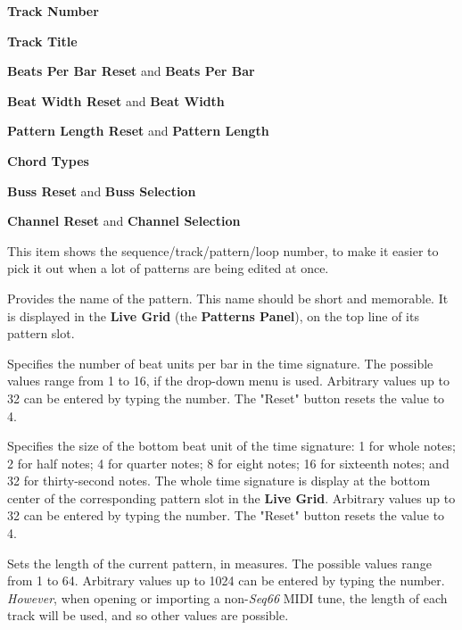    \begin{enumber}
      \item \textbf{Track Number}
      \item \textbf{Track Title}
      \item \textbf{Beats Per Bar Reset} and \textbf{Beats Per Bar}
      \item \textbf{Beat Width Reset} and \textbf{Beat Width}
      \item \textbf{Pattern Length Reset} and \textbf{Pattern Length}
      \item \textbf{Chord Types}
      \item \textbf{Buss Reset} and \textbf{Buss Selection}
      \item \textbf{Channel Reset} and \textbf{Channel Selection}
   \end{enumber}

   \setcounter{ItemCounter}{0}      %

   This item shows the sequence/track/pattern/loop
   number, to make it easier to pick it out when a lot of patterns are being
   edited at once.

   Provides the name of the pattern.
   This name should be short and memorable.
   It is displayed in the \textbf{Live Grid} (the \textbf{Patterns Panel}),
   on the top line of its pattern slot.

   Specifies the number of beat units per bar in the time signature.
   The possible values range from 1 to 16, if the drop-down menu is used.
   Arbitrary values up to 32 can be entered by typing the number.
   The "Reset" button resets the value to 4.

   Specifies the size of the bottom beat unit of the time signature:
   1 for whole notes; 2 for half notes; 4 for quarter notes; 8 for eight notes;
   16 for sixteenth notes; and 32 for thirty-second notes.
   The whole time signature is display at the bottom center of the
   corresponding pattern slot in the \textbf{Live Grid}.
   Arbitrary values up to 32 can be entered by typing the number.
   The "Reset" button resets the value to 4.

   Sets the length of the current pattern, in measures.
   The possible values range from 1 to 64.
   Arbitrary values up to 1024 can be entered by typing the number.
   \textsl{However}, when opening or importing a non-\textsl{Seq66}
   MIDI tune, the length of each track will be used, and so other values
   are possible.

